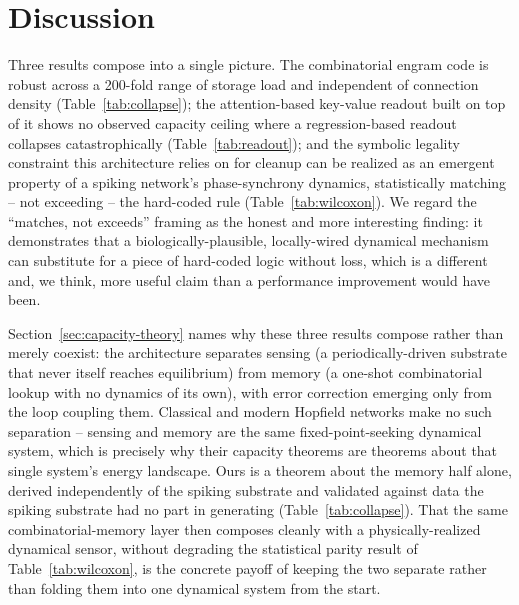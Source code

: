 \documentclass[11pt]{article}
\begin{document}
\section{Discussion}

Three results compose into a single picture. The combinatorial engram code is robust across
a 200-fold range of storage load and independent of connection density
(Table~\ref{tab:collapse}); the attention-based key-value readout built on top of it shows no
observed capacity ceiling where a regression-based readout collapses catastrophically
(Table~\ref{tab:readout}); and the symbolic legality constraint this architecture relies on
for cleanup can be realized as an emergent property of a spiking network's phase-synchrony
dynamics, statistically matching -- not exceeding -- the hard-coded rule
(Table~\ref{tab:wilcoxon}). We regard the ``matches, not exceeds'' framing as the honest and
more interesting finding: it demonstrates that a biologically-plausible, locally-wired
dynamical mechanism can substitute for a piece of hard-coded logic without loss, which is a
different and, we think, more useful claim than a performance improvement would have been.

Section~\ref{sec:capacity-theory} names why these three results compose rather than merely
coexist: the architecture separates sensing (a periodically-driven substrate that never itself
reaches equilibrium) from memory (a one-shot combinatorial lookup with no dynamics of its own),
with error correction emerging only from the loop coupling them. Classical and modern Hopfield
networks make no such separation -- sensing and memory are the same fixed-point-seeking
dynamical system, which is precisely why their capacity theorems
\cite{ramsauer2020} are theorems about that single system's energy landscape. Ours is a
theorem about the memory half alone, derived independently of the spiking substrate and
validated against data the spiking substrate had no part in generating (Table~\ref{tab:collapse}).
That the same combinatorial-memory layer then composes cleanly with a physically-realized
dynamical sensor, without degrading the statistical parity result of Table~\ref{tab:wilcoxon}, is
the concrete payoff of keeping the two separate rather than folding them into one dynamical
system from the start.
\end{document}
